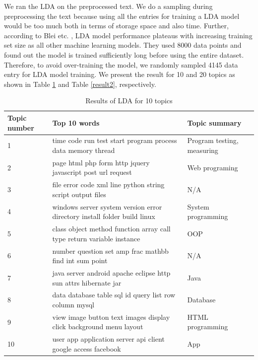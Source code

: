 \documentclass[conference]{IEEEtran}
\begin{document}
We ran the LDA on the preprocessed text. We do a sampling during preprocessing the text because using all the entries for training a LDA model would be too much both in terms of storage space and also time. Further, according to Blei etc. \cite{blei2003latent}, LDA model performance plateaus with increasing training set size as all other machine learning models. They used 8000 data points and found out the model is trained sufficiently long before using the entire dataset. Therefore, to avoid over-training the model, we randomly sampled 4145 data entry for LDA model training. We present the result for 10 and 20 topics as shown in Table \ref{result1} and Table \ref{result2}, respectively.

\begin{table}[!t]
\caption{Results of LDA for 10 topics}
\label{result1}
\centering
  \begin{tabular}{ l  l  l }
    \hline
    Topic number & Top 10 words & Topic summary \\ \hline
    1 & time code run test start program process data memory thread & Program testing, measuring \\ 
    2 & page html php form http jquery javascript post url request & Web programing \\ 
    3 & file error code xml line python string script output files  & N/A \\ 
    4 & windows server system version error directory install folder build linux & System programming \\ 
    5 & class object method function array call type return variable instance & OOP \\ 
    6 & number question set amp frac mathbb find int sum point & N/A \\ 
    7 & java server android apache eclipse http sun attrs hibernate jar & Java \\ 
    8 & data database table sql id query list row column mysql & Database \\ 
    9 & view image button text images display click background menu layout & HTML programming \\ 
    10 & user app application server api client google access facebook & App \\
    \hline
  \end{tabular}
\end{table}
\end{document}
